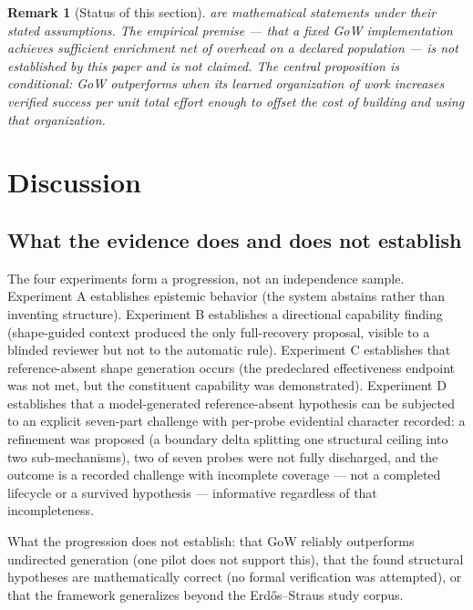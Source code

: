 \documentclass[11pt]{article}
\theoremstyle{gowthm}
\newtheorem{remark}{Remark}[section]
\theoremstyle{gowplain}
\begin{document}
\begin{remark}[Status of this section]
\label{rem:superiority-status}
 are mathematical
statements under their stated assumptions. The empirical premise --- that a fixed
GoW implementation achieves sufficient enrichment net of overhead on a declared
population --- is \emph{not} established by this paper and is not claimed. The
central proposition is conditional: GoW outperforms when its learned organization
of work increases verified success per unit total effort enough to offset the
cost of building and using that organization.
\end{remark}

\section{Discussion}
\label{sec:discussion}

\subsection{What the evidence does and does not establish}

The four experiments form a progression, not an independence sample. Experiment A
establishes epistemic behavior (the system abstains rather than inventing
structure). Experiment B establishes a directional capability finding (shape-guided
context produced the only full-recovery proposal, visible to a blinded reviewer
but not to the automatic rule). Experiment C establishes that reference-absent
shape generation occurs (the predeclared effectiveness endpoint was not met, but
the constituent capability was demonstrated). Experiment D establishes that a
model-generated reference-absent hypothesis can be subjected to an explicit
seven-part challenge with per-probe evidential character recorded: a
refinement was proposed (a boundary delta splitting one structural ceiling
into two sub-mechanisms), two of seven probes were not fully discharged, and
the outcome is a recorded challenge with incomplete coverage --- not a
completed lifecycle or a survived hypothesis --- informative regardless of
that incompleteness.

What the progression does not establish: that GoW reliably outperforms undirected
generation (one pilot does not support this), that the found structural hypotheses
are mathematically correct (no formal verification was attempted), or that the
framework generalizes beyond the Erd\H{o}s--Straus study corpus.
\end{document}
